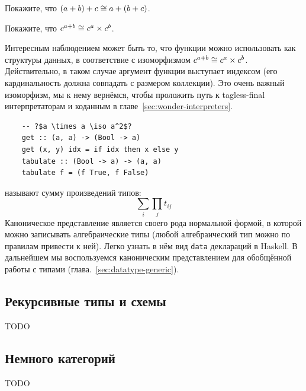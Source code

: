 \begin{task}
    Покажите, что $(a + b) + c \cong a + (b + c)$.
\end{task}

\begin{task}
    Покажите, что $c^{a + b} \cong c^a\times c^b$.
\end{task}

Интересным наблюдением может быть то, что функции можно использовать как структуры данных, в соответствие с изоморфизмом $c^{a + b} \cong c^a\times c^b$.
Действительно, в таком случае аргумент функции выступает индексом (его кардинальность должна совпадать с размером коллекции).
Это очень важный изоморфизм, мы к нему вернёмся, чтобы проложить путь к tagless-final интерпретаторам и коданным в главе~\ref{sec:wonder-interpreters}.
\begin{verbatim}
    -- ?$a \times a \iso a^2$?
    get :: (a, a) -> (Bool -> a)
    get (x, y) idx = if idx then x else y
    tabulate :: (Bool -> a) -> (a, a)
    tabulate f = (f True, f False)
\end{verbatim}

 называют сумму произведений типов:
\[
    \sum_{i}\prod_{j} t_{ij}
\]
Каноническое представление является своего рода нормальной формой, в которой можно записывать алгебраические типы (любой алгебраический тип можно по правилам привести к ней).
Легко узнать в нём вид \texttt{data} деклараций в Haskell.
В дальнейшем мы воспользуемся каноническим представлением для обобщённой работы с типами (глава.~\ref{sec:datatype-generic}).

\subsection{Рекурсивные типы и схемы} \label{subsec:recursive-types}

TODO %

\subsection{Немного категорий} \label{subsec:cats}

TODO %
